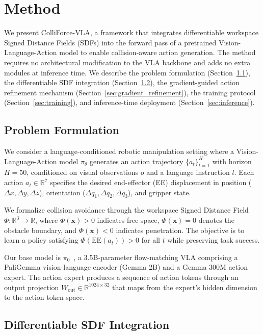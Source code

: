 \section{Method}\label{sec:method}

We present ColliForce-VLA, a framework that integrates differentiable workspace Signed Distance Fields (SDFs) into the forward pass of a pretrained Vision-Language-Action model to enable collision-aware action generation. The method requires no architectural modification to the VLA backbone and adds no extra modules at inference time. We describe the problem formulation (Section~\ref{sec:problem}), the differentiable SDF integration (Section~\ref{sec:sdf_integration}), the gradient-guided action refinement mechanism (Section~\ref{sec:gradient_refinement}), the training protocol (Section~\ref{sec:training}), and inference-time deployment (Section~\ref{sec:inference}).

\subsection{Problem Formulation}\label{sec:problem}

We consider a language-conditioned robotic manipulation setting where a Vision-Language-Action model $\pi_\theta$ generates an action trajectory $\{a_t\}_{t=1}^{H}$ with horizon $H = 50$, conditioned on visual observations $o$ and a language instruction $l$. Each action $a_t \in \mathbb{R}^7$ specifies the desired end-effector (EE) displacement in position ($\Delta x, \Delta y, \Delta z$), orientation ($\Delta q_1, \Delta q_2, \Delta q_3$), and gripper state.

We formalize collision avoidance through the workspace Signed Distance Field $\Phi: \mathbb{R}^3 \to \mathbb{R}$, where $\Phi(\mathbf{x}) > 0$ indicates free space, $\Phi(\mathbf{x}) = 0$ denotes the obstacle boundary, and $\Phi(\mathbf{x}) < 0$ indicates penetration. The objective is to learn a policy satisfying $\Phi(\mathrm{EE}(a_t)) > 0$ for all $t$ while preserving task success.

Our base model is $\pi_0$~\cite{black2024pi0}, a 3.5B-parameter flow-matching VLA comprising a PaliGemma vision-language encoder (Gemma 2B) and a Gemma 300M action expert. The action expert produces a sequence of action tokens through an output projection $W_{\mathrm{out}} \in \mathbb{R}^{1024 \times 32}$ that maps from the expert's hidden dimension to the action token space.

\subsection{Differentiable SDF Integration}\label{sec:sdf_integration}

